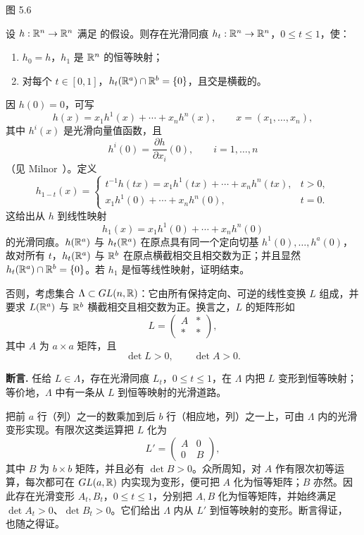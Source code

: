 \begin{center}
  \begin{minipage}{\linewidth}\centering
  \FigFiveSix

  \label{fig:5.6}图 5.6
  \end{minipage}
\end{center}

设 $h:\mathbb{R}^n\to\mathbb{R}^n$ 满足 的假设。则存在光滑同痕 $h_t:\mathbb{R}^n\to\mathbb{R}^n$，$0\leq t\leq1$，使：
\begin{enumerate}[label=(\roman*)]
  \item $h_0=h$，$h_1$ 是 $\mathbb{R}^n$ 的恒等映射；
  \item 对每个 $t\in[0,1]$，$h_t(\mathbb{R}^a)\cap\mathbb{R}^b=\{0\}$，且交是横截的。
\end{enumerate}

\Proof 因 $h(0)=0$，可写
\[
  h(x)=x_1h^1(x)+\cdots+x_nh^n(x),
  \qquad x=(x_1,\ldots,x_n),
\]
其中 $h^i(x)$ 是光滑向量值函数，且
\[
  h^i(0)=\frac{\partial h}{\partial x_i}(0),
  \qquad i=1,\ldots,n
\]
（见 Milnor~\cite[p.~6]{ref04}）。定义
\[
  h_{1-t}(x)=
  \begin{cases}
    t^{-1}h(tx)=x_1h^1(tx)+\cdots+x_nh^n(tx),&t>0,\\
    x_1h^1(0)+\cdots+x_nh^n(0),&t=0.
  \end{cases}
\]
这给出从 $h$ 到线性映射
\[
  h_1(x)=x_1h^1(0)+\cdots+x_nh^n(0)
\]
的光滑同痕。$h(\mathbb{R}^a)$ 与 $h_t(\mathbb{R}^a)$ 在原点具有同一个定向切基
$h^1(0),\ldots,h^a(0)$，故对所有 $t$，$h_t(\mathbb{R}^a)$ 与 $\mathbb{R}^b$ 在原点横截相交且相交数为正；并且显然
$h_t(\mathbb{R}^a)\cap\mathbb{R}^b=\{0\}$。若 $h_1$ 是恒等线性映射，证明结束。

否则，考虑集合 $\Lambda\subset GL(n,\mathbb{R})$：它由所有保持定向、可逆的线性变换 $L$ 组成，并要求 $L(\mathbb{R}^a)$ 与 $\mathbb{R}^b$ 横截相交且相交数为正。换言之，$L$ 的矩阵形如
\[
  L=\begin{pmatrix}A&*\\ *&*\end{pmatrix},
\]
其中 $A$ 为 $a\times a$ 矩阵，且
\[
  \det L>0,
  \qquad
  \det A>0.
\]

\par\medskip\noindent\textbf{断言.}\quad
任给 $L\in\Lambda$，存在光滑同痕 $L_t$，$0\leq t\leq1$，在 $\Lambda$ 内把 $L$ 变形到恒等映射；等价地，$\Lambda$ 中有一条从 $L$ 到恒等映射的光滑道路。

\Proof 把前 $a$ 行（列）之一的数乘加到后 $b$ 行（相应地，列）之一上，可由 $\Lambda$ 内的光滑变形实现。有限次这类运算把 $L$ 化为
\[
  L'=\begin{pmatrix}A&0\\0&B\end{pmatrix},
\]
其中 $B$ 为 $b\times b$ 矩阵，并且必有 $\det B>0$。众所周知，对 $A$ 作有限次初等运算，每次都可在 $GL(a,\mathbb{R})$ 内实现为变形，便可把 $A$ 化为恒等矩阵；$B$ 亦然。因此存在光滑变形 $A_t,B_t$，$0\leq t\leq1$，分别把 $A,B$ 化为恒等矩阵，并始终满足
$\det A_t>0$、$\det B_t>0$。它们给出 $\Lambda$ 内从 $L'$ 到恒等映射的变形。断言得证， 也随之得证。
\EndProof

